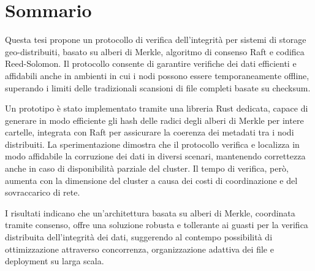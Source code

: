 \shipout\null
\chapter*{Sommario}
\thispagestyle{empty} 

Questa tesi propone un protocollo di verifica dell'integrità per sistemi di
storage geo-distribuiti, basato su alberi di Merkle, algoritmo di consenso Raft
e codifica Reed-Solomon. Il protocollo consente di garantire verifiche dei dati
efficienti e affidabili anche in ambienti in cui i nodi possono essere
temporaneamente offline, superando i limiti delle tradizionali scansioni di file
completi basate su checksum.

Un prototipo è stato implementato tramite una libreria Rust dedicata, capace di
generare in modo efficiente gli hash delle radici degli alberi di Merkle per
intere cartelle, integrata con Raft per assicurare la coerenza dei metadati tra
i nodi distribuiti. La sperimentazione dimostra che il protocollo verifica e
localizza in modo affidabile la corruzione dei dati in diversi scenari,
mantenendo correttezza anche in caso di disponibilità parziale del cluster. Il
tempo di verifica, però, aumenta con la dimensione del cluster a causa dei costi di coordinazione e del sovraccarico di rete.

I risultati indicano che un'architettura basata su alberi di Merkle, coordinata tramite consenso, offre una soluzione robusta e tollerante ai guasti per la verifica distribuita dell'integrità dei dati, suggerendo al contempo possibilità di ottimizzazione attraverso concorrenza, organizzazione adattiva dei file e deployment su larga scala.
